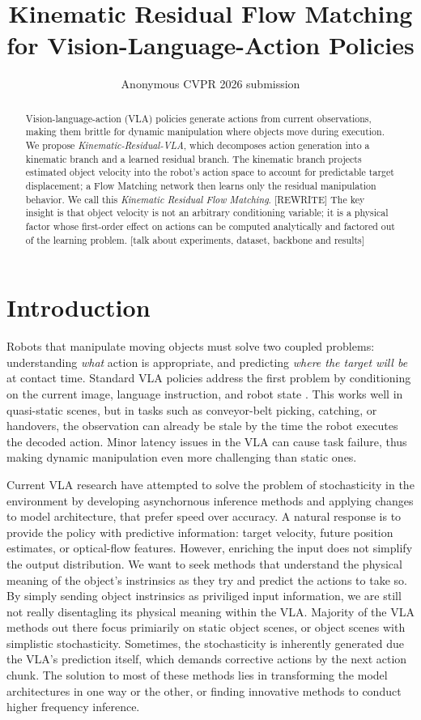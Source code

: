 \documentclass[10pt,twocolumn,letterpaper]{article}
\title{Kinematic Residual Flow Matching for Vision-Language-Action Policies}
\author{Anonymous CVPR 2026 submission}
\newcommand{\EditAP}[1]{{\color{blue} #1}}
\begin{document}
\maketitle

\begin{abstract}
Vision-language-action (VLA) policies generate actions from current observations, making them brittle for dynamic manipulation where objects move during execution. We propose \emph{Kinematic-Residual-VLA}, which decomposes action generation into a kinematic branch and a learned residual branch. The kinematic branch projects estimated object velocity into the robot's action space to account for predictable target displacement; a Flow Matching network then learns only the residual manipulation behavior. We call this \emph{Kinematic Residual Flow Matching}. \EditAP{[REWRITE] The key insight is that object velocity is not an arbitrary conditioning variable; it is a physical factor whose first-order effect on actions can be computed analytically and factored out of the learning problem.} \EditAP{[talk about experiments, dataset, backbone and results]}
\end{abstract}

\section{Introduction}
\label{sec:intro}

Robots that manipulate moving objects must solve two coupled problems: understanding \emph{what} action is appropriate, and predicting \emph{where the target will be} at contact time. Standard VLA policies address the first problem by conditioning on the current image, language instruction, and robot state \citep{brohan2023rt1,zitkovich2023rt2,kim2024openvla}. This works well in quasi-static scenes, but in tasks such as conveyor-belt picking, catching, or handovers, the observation can already be stale by the time the robot executes the decoded action. Minor latency issues in the VLA can cause task failure, thus making dynamic manipulation even more challenging than static ones.

Current VLA research have attempted to solve the problem of stochasticity in the environment by developing asynchornous inference methods and applying changes to model architecture, that prefer speed over accuracy. A natural response is to provide the policy with predictive information: target velocity, future position estimates, or optical-flow features. However, enriching the input does not simplify the output distribution. We want to seek methods that understand the physical meaning of the object's instrinsics as they try and predict the actions to take so. By simply sending object instrinsics as priviliged input information, we are still not really disentagling its physical meaning within the VLA. 
Majority of the VLA methods out there focus primiarily on static object scenes, or object scenes with simplistic stochasticity. Sometimes, the stochasticity is inherently generated due the VLA's prediction itself, which demands corrective actions by the next action chunk. The solution to most of these methods lies in transforming the model architectures in one way or the other, or finding innovative methods to conduct higher frequency inference.  
\end{document}
